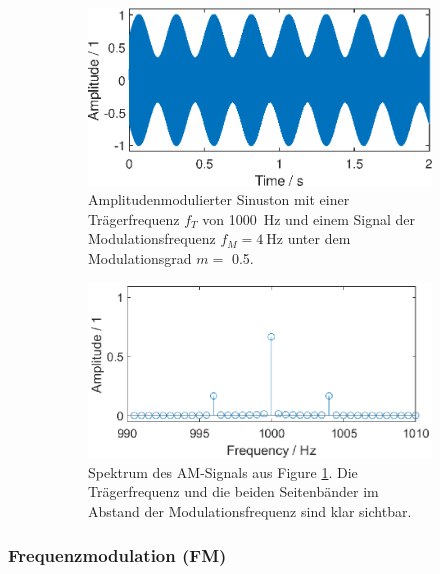 \begin{figure}[h]
    \centering
\begin{subfigure}{.49\textwidth} 
  \centering
  \includegraphics[width=.85\linewidth]{ue4/AM_1000_4.eps} %
  \caption{Amplitudenmodulierter Sinuston mit einer Trägerfrequenz $f_T$ von \SI{1000}{\Hz} und einem Signal der Modulationsfrequenz $f_M =  \SI{4}{\Hz}$ unter dem Modulationsgrad $m =$ 0.5.}
  \label{fig:AM_1000_4}
  \end{subfigure}%
\hfill
\begin{subfigure}{.49\textwidth} 
  \centering
  \includegraphics[width=\linewidth]{ue4/AM_1000_4_fft.eps} %
  \caption{Spektrum des AM-Signals aus Figure \ref{fig:AM_1000_4}. Die Trägerfrequenz und die beiden Seitenbänder im Abstand der Modulationsfrequenz sind klar sichtbar.}
  \label{fig:AM_1000_4_fft}
\end{subfigure}
    \caption{}
    \label{fig:AM}
\end{figure}
\clearpage

\subsubsection{Frequenzmodulation (FM)}


